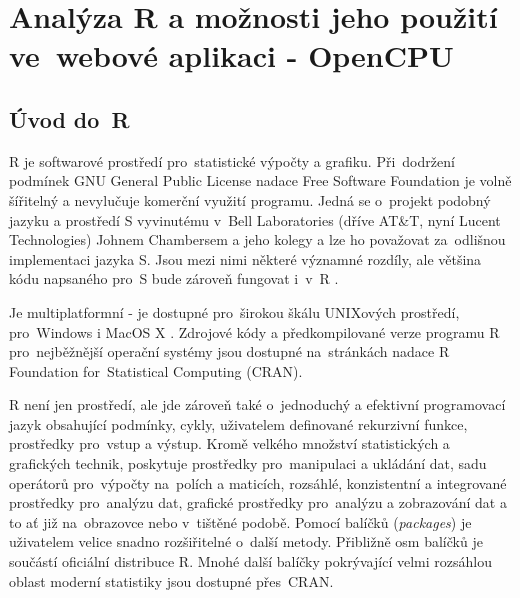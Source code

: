 \documentclass[thesis=B,czech]{FITthesis}[2012/06/26]
\begin{document}
%
\chapter[Analýza: R]{Analýza R a možnosti jeho použití ve~webové aplikaci - OpenCPU}
\section{Úvod do~R}
R je softwarové prostředí pro~statistické výpočty a grafiku. Při~dodržení podmínek GNU General Public License nadace Free Software Foundation je volně šířitelný a nevylučuje komerční využití programu. Jedná se o~projekt podobný jazyku a prostředí S vyvinutému v~Bell Laboratories (dříve AT\&T, nyní Lucent Technologies) Johnem Chambersem a jeho kolegy a lze ho považovat za~odlišnou implementaci jazyka S. Jsou mezi nimi některé významné rozdíly, ale většina kódu napsaného pro~S bude zároveň fungovat i~v~R \cite{rproject.org-about}.

Je multiplatformní - je dostupné pro~širokou škálu UNIXových prostředí, pro~Windows i MacOS X \cite{rproject.org}.  Zdrojové kódy a předkompilované verze programu R pro~nejběžnější operační systémy jsou dostupné na~stránkách nadace R Foundation for~Statistical Computing (CRAN).

R není jen prostředí, ale jde zároveň také o~jednoduchý a efektivní programovací jazyk obsahující podmínky, cykly, uživatelem definované rekurzivní funkce, prostředky pro~vstup a výstup. Kromě velkého množství statistických a grafických technik, poskytuje prostředky pro~manipulaci a ukládání dat, sadu operátorů pro~výpočty na~polích a maticích, rozsáhlé, konzistentní a integrované prostředky pro~analýzu dat, grafické prostředky pro~analýzu a zobrazování dat a to ať již na~obrazovce nebo v~tištěné podobě. Pomocí balíčků (\textit{packages}) je uživatelem velice snadno rozšiřitelné o~další metody. Přibližně osm balíčků je součástí oficiální distribuce R. Mnohé další balíčky pokrývající velmi rozsáhlou oblast moderní statistiky jsou dostupné přes~CRAN.
\end{document}
